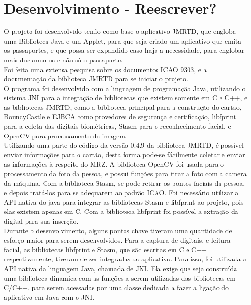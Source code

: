 \documentclass{article}
\begin{document}
	\section{Desenvolvimento - Reescrever? }
		\begin{justify}
			
		\hspace{2cm}O projeto foi desenvolvido tendo como base o aplicativo JMRTD\parencite{JMRTD}, que engloba uma Biblioteca Java e um Applet, para que seja criado um aplicativo que emita os passaportes, e que possa ser expandido caso haja a necessidade, para englobar mais documentos e não só o passaporte.\\
		\hspace*{2cm}Foi feita uma extensa pesquisa sobre os documentos ICAO 9303\parencite{ICAO}, e a documentação da biblioteca JMRTD para se iniciar o projeto.\\
		\hspace*{2cm}O programa foi desenvolvido com a linguagem de programação Java, utilizando o sistema JNI para a integração de bibliotecas que existem somente em C e C++, e as bibliotecas JMRTD, como a biblioteca principal para a construção do cartão, BouncyCastle\parencite{BOUNCYCASTLE} e EJBCA\parencite{EJBCA} como provedores de segurança e certificação, libfprint\parencite{PRINT} para a coleta das digitais biométricas, Stasm\parencite{STASM} para o reconhecimento facial, e OpenCV\parencite{OPENCV} para processamento de imagem.\\
		\hspace*{2cm}Utilizando uma parte do código da versão 0.4.9 da biblioteca JMRTD, é possível enviar informações para o cartão, desta forma pode-se fácilmente coletar e enviar as informações à respeito do MRZ. A biblioteca OpenCV foi usada para o processamento da foto da pessoa, e possui funções para tirar a foto com a camera da máquina. Com a biblioteca Stasm, se pode retirar os pontos faciais da pessoa, e depois tratá-los para se adequarem ao padrão ICAO. Foi necessário utilizar a API nativa do java para integrar as bibliotecas Stasm e libfprint ao projeto, pois elas existem apenas em C. Com a biblioteca libfprint foi possível a extração da digital para sua inserção.\\
		\hspace*{2cm}Durante o desenvolvimento, alguns pontos chave tiveram uma quantidade de esforço maior para serem desenvolvidos. Para a captura de digitais, e leitura facial, as bibliotecas libfprint e Stasm, que são escritas em C e C++ respectivamente, tiveram de ser integradas ao aplicativo. Para isso, foi utilizada a API nativa da linguagem Java, chamada de JNI. Ela exige que seja construída uma biblioteca dinamica com as funções a serem utilizadas das bibliotecas em C/C++, para serem acessadas por uma classe dedicada a fazer a ligação do aplicativo em Java com o JNI.\\

\end{justify}
\end{document}
